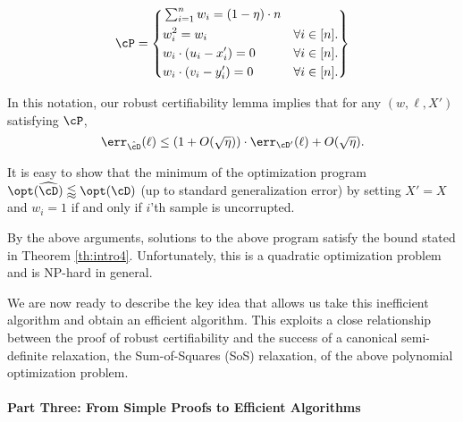 \begin{equation}
  \cP = 
  \left \{
    \begin{aligned}
      & \textstyle\sum_{i=1}^n w_i
      = (1-\eta) \cdot n & &\\
      & w_i^2
      =w_i 
      &\forall i\in [n]. &\\
      & w_i \cdot (u_i - x'_i)
       = 0
      &\forall i\in [n]. &\\
      & w_i \cdot (v_i - y'_i)
      = 0
      &\forall i\in [n]. &%
    \end{aligned}
  \right \} \label{eq:introprogram}
\end{equation}

In this notation, our robust certifiability lemma implies that for any $(w,\ell,X')$ satisfying $\cP$, 
\begin{equation}\label{eq:intro1}
\err_{\hat{\cD}}(\ell) \leq (1 + O(\sqrt{\eta})) \cdot \err_{\cD'}(\ell) + O(\sqrt{\eta}).
\end{equation}

It is easy to show that the minimum of the optimization program $\opt(\widehat{\cD}) \lessapprox \opt(\cD)$ (up to standard generalization error) by setting $X' = X$ and $w_i = 1$ if and only if $i$'th sample is uncorrupted. 

By the above arguments, solutions to the above program satisfy the bound stated in Theorem \ref{th:intro4}. Unfortunately, this is a quadratic optimization problem and is NP-hard in general. 

We are now ready to describe the key idea that allows us take this inefficient algorithm and obtain an efficient algorithm. This exploits a close relationship between the proof of robust certifiability and the success of a canonical semi-definite relaxation, the Sum-of-Squares (SoS) relaxation, of the above polynomial optimization problem. %

\paragraph{Part Three: From Simple Proofs to Efficient Algorithms} %


